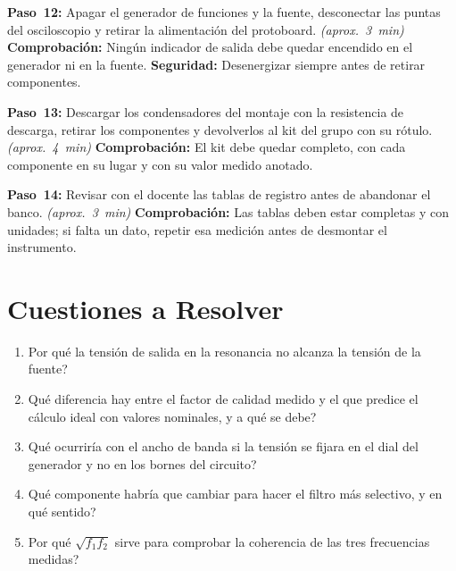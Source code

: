 \documentclass[12pt]{article}
\begin{document}
\begin{pasos}
  \item \textbf{Paso~12:} Apagar el generador de funciones y la fuente, desconectar las puntas del osciloscopio y retirar la alimentación del protoboard. \emph{(aprox.~\SI{3}{\minute})} \textbf{Comprobación:} Ningún indicador de salida debe quedar encendido en el generador ni en la fuente. \textbf{Seguridad:} Desenergizar siempre antes de retirar componentes.
  \item \textbf{Paso~13:} Descargar los condensadores del montaje con la resistencia de descarga, retirar los componentes y devolverlos al kit del grupo con su rótulo. \emph{(aprox.~\SI{4}{\minute})} \textbf{Comprobación:} El kit debe quedar completo, con cada componente en su lugar y con su valor medido anotado.
  \item \textbf{Paso~14:} Revisar con el docente las tablas de registro antes de abandonar el banco. \emph{(aprox.~\SI{3}{\minute})} \textbf{Comprobación:} Las tablas deben estar completas y con unidades; si falta un dato, repetir esa medición antes de desmontar el instrumento.
\end{pasos}

\section{Cuestiones a Resolver}\label{sec:cuestiones}
\begin{enumerate}
  \item \textquestiondown{}Por qué la tensión de salida en la resonancia no alcanza la tensión de la fuente?
  \item \textquestiondown{}Qué diferencia hay entre el factor de calidad medido y el que predice el cálculo ideal con valores nominales, y a qué se debe?
  \item \textquestiondown{}Qué ocurriría con el ancho de banda si la tensión se fijara en el dial del generador y no en los bornes del circuito?
  \item \textquestiondown{}Qué componente habría que cambiar para hacer el filtro más selectivo, y en qué sentido?
  \item \textquestiondown{}Por qué $\sqrt{f_1 f_2}$ sirve para comprobar la coherencia de las tres frecuencias medidas?
\end{enumerate}

\end{document}
